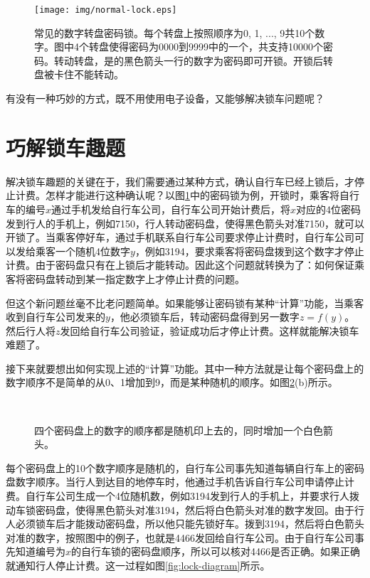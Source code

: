 \documentclass[UTF8]{article}
\begin{document}
\begin{figure}[htbp]
  \centering
  \texttt{[image: img/normal-lock.eps]}
  \caption{常见的数字转盘密码锁。每个转盘上按照顺序为0, 1, ..., 9共10个数字。图中4个转盘使得密码为0000到9999中的一个，共支持10000个密码。转动转盘，是的黑色箭头一行的数字为密码即可开锁。开锁后转盘被卡住不能转动。}
  \label{fig:normal-lock}
\end{figure}


有没有一种巧妙的方式，既不用使用电子设备，又能够解决锁车问题呢？

\section{巧解锁车趣题}

解决锁车趣题的关键在于，我们需要通过某种方式，确认自行车已经上锁后，才停止计费。怎样才能进行这种确认呢？以图\ref{fig:normal-lock}中的密码锁为例，开锁时，乘客将自行车的编号$x$通过手机发给自行车公司，自行车公司开始计费后，将$x$对应的4位密码发到行人的手机上，例如7150，行人转动密码盘，使得黑色箭头对准7150，就可以开锁了。当乘客停好车，通过手机联系自行车公司要求停止计费时，自行车公司可以发给乘客一个随机4位数字$y$，例如3194，要求乘客将密码盘拨到这个数字才停止计费。由于密码盘只有在上锁后才能转动。因此这个问题就转换为了：如何保证乘客将密码盘转动到某一指定数字上才停止计费的问题。

但这个新问题丝毫不比老问题简单。如果能够让密码锁有某种“计算”功能，当乘客收到自行车公司发来的$y$，他必须锁车后，转动密码盘得到另一数字$z=f(y)$。然后行人将$z$发回给自行车公司验证，验证成功后才停止计费。这样就能解决锁车难题了。

接下来就要想出如何实现上述的“计算”功能。其中一种方法就是让每个密码盘上的数字顺序不是简单的从0、1增加到9，而是某种随机的顺序。如图\ref{fig:random-lock}(b)所示。

\begin{figure}[htbp]
  \centering
   \\
  \caption{四个密码盘上的数字的顺序都是随机印上去的，同时增加一个白色箭头。}
  \label{fig:random-lock}
\end{figure}

每个密码盘上的10个数字顺序是随机的，自行车公司事先知道每辆自行车上的密码盘数字顺序。当行人到达目的地停车时，他通过手机告诉自行车公司申请停止计费。自行车公司生成一个4位随机数，例如3194发到行人的手机上，并要求行人拨动车锁密码盘，使得黑色箭头对准3194，然后将白色箭头对准的数字发回。由于行人必须锁车后才能拨动密码盘，所以他只能先锁好车。拨到3194，然后将白色箭头对准的数字，按照图中的例子，也就是4466发回给自行车公司。由于自行车公司事先知道编号为$x$的自行车锁的密码盘顺序，所以可以核对4466是否正确。如果正确就通知行人停止计费。这一过程如图\ref{fig:lock-diagram}所示。
\end{document}
